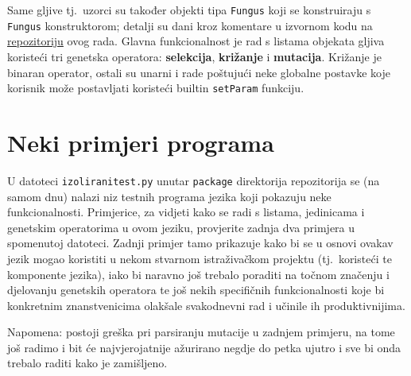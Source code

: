 \documentclass[12pt]{scrartcl}
\begin{document}
Same gljive tj.\ uzorci su također objekti tipa \verb|Fungus| koji se konstruiraju s \verb|Fungus| konstruktorom; detalji su dani kroz komentare
u izvornom kodu na \href{https://github.com/mraguzin/ip-projekt}{repozitoriju} ovog rada. Glavna funkcionalnost je rad s listama objekata gljiva
koristeći tri genetska operatora: \textbf{selekcija}, \textbf{križanje} i \textbf{mutacija}. Križanje je binaran operator, ostali su unarni i rade
poštujući neke globalne postavke koje korisnik može postavljati koristeći builtin \verb|setParam| funkciju.

\section{Neki primjeri programa}
U datoteci \verb|izoliranitest.py| unutar \verb|package| direktorija repozitorija se (na samom dnu) nalazi niz testnih programa jezika koji
pokazuju neke funkcionalnosti. Primjerice, za vidjeti kako se radi s listama, jedinicama i genetskim operatorima u ovom jeziku, provjerite
zadnja dva primjera u spomenutoj datoteci. Zadnji primjer tamo prikazuje kako bi se u osnovi ovakav jezik mogao koristiti u nekom stvarnom
istraživačkom projektu (tj.\ koristeći te komponente jezika), iako bi naravno još trebalo poraditi na točnom značenju
i djelovanju genetskih operatora te još nekih specifičnih
funkcionalnosti koje bi konkretnim znanstvenicima olakšale svakodnevni rad i učinile ih produktivnijima.

Napomena: postoji greška pri parsiranju mutacije u zadnjem primjeru, na tome još radimo i bit će najvjerojatnije ažurirano negdje do petka ujutro
i sve bi onda trebalo raditi kako je zamišljeno.
\end{document}
